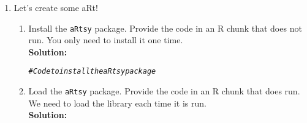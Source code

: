 \documentclass{article}\usepackage[]{graphicx}\usepackage[]{xcolor}
\makeatletter
\newcommand{\hlcom}[1]{\textcolor[rgb]{0.678,0.584,0.686}{\textit{#1}}}%
\newenvironment{kframe}{%
 \def\at@end@of@kframe{}%
 \ifinner\ifhmode%
  \def\at@end@of@kframe{\end{minipage}}%
  \begin{minipage}{\columnwidth}%
 \fi\fi%
 \def\FrameCommand##1{\hskip\@totalleftmargin \hskip-\fboxsep
 \colorbox{shadecolor}{##1}\hskip-\fboxsep
     \hskip-\linewidth \hskip-\@totalleftmargin \hskip\columnwidth}%
 \MakeFramed {\advance\hsize-\width
   \@totalleftmargin\z@ \linewidth\hsize
   \@setminipage}}%
 {\par\unskip\endMakeFramed%
 \at@end@of@kframe}
\newenvironment{knitrout}{}{} %
\makeatother
\begin{document}
\begin{enumerate}
\item Let's create some aRt! 
  \begin{enumerate}
\item Install the \texttt{aRtsy} package. Provide the code in an R chunk   that does 
not run. You only need to install it one time.\\
\textbf{Solution:}
\begin{knitrout}\scriptsize
{}\color{fgcolor}\begin{kframe}
\begin{alltt}
\hlcom{# Code to install the aRtsy package}
\end{alltt}
\end{kframe}
\end{knitrout}
  \item Load the \texttt{aRtsy} package. Provide the code in an R chunk that does run. 
  We need to load the library each time it is run.\\
\textbf{Solution:}


\end{enumerate}
\end{enumerate}
\end{document}
